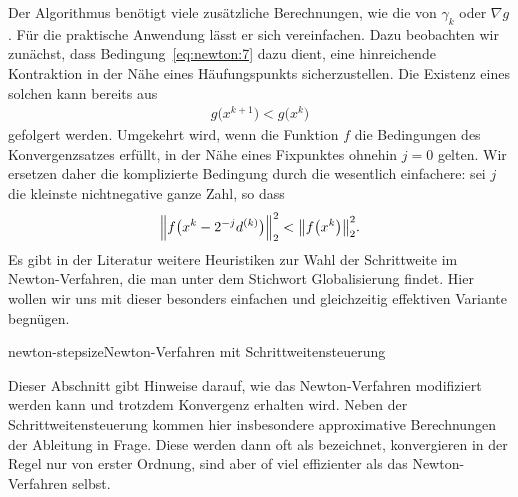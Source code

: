 \begin{remark}
  Der Algorithmus benötigt viele zusätzliche Berechnungen, wie die von
  $\gamma_k$ oder $\nabla g$. Für die praktische Anwendung lässt er
  sich vereinfachen. Dazu beobachten wir zunächst, dass
  Bedingung~\eqref{eq:newton:7} dazu dient, eine hinreichende
  Kontraktion in der Nähe eines Häufungspunkts sicherzustellen. Die
  Existenz eines solchen kann bereits aus
  \begin{gather}
    g\bigl(x^{k+1}\bigr) < g\bigl(x^{k}\bigr)
  \end{gather}
  gefolgert werden. Umgekehrt wird, wenn die Funktion $f$ die
  Bedingungen des Konvergenzsatzes 
  erfüllt, in der Nähe eines Fixpunktes ohnehin $j=0$ gelten. Wir
  ersetzen daher die komplizierte Bedingung durch die wesentlich
  einfachere: sei $j$ die kleinste nichtnegative ganze Zahl, so dass
  \begin{gather}
    \norm*{f\bigl(x^{k} - 2^{-j} d^{(k)}\bigr)}_2^2 < \norm*{f\bigl(x^{k}\bigr)}_2^2.
  \end{gather}
  Es gibt in der Literatur weitere Heuristiken zur Wahl der
  Schrittweite im Newton-Verfahren, die man unter dem Stichwort \glqq
  Globalisierung\grqq{} findet. Hier wollen wir uns mit dieser
  besonders einfachen und gleichzeitig effektiven Variante begnügen.
\end{remark}

\begin{Algorithmus*}{newton-stepsize}{Newton-Verfahren mit Schrittweitensteuerung}
  
\end{Algorithmus*}

\begin{remark}
  Dieser Abschnitt gibt Hinweise darauf, wie das Newton-Verfahren
  modifiziert werden kann und trotzdem Konvergenz erhalten wird. Neben
  der Schrittweitensteuerung kommen hier insbesondere approximative
  Berechnungen der Ableitung in Frage. Diese werden dann oft als
   bezeichnet, konvergieren in der
  Regel nur von erster Ordnung, sind aber of viel effizienter als das
  Newton-Verfahren selbst.
\end{remark}

